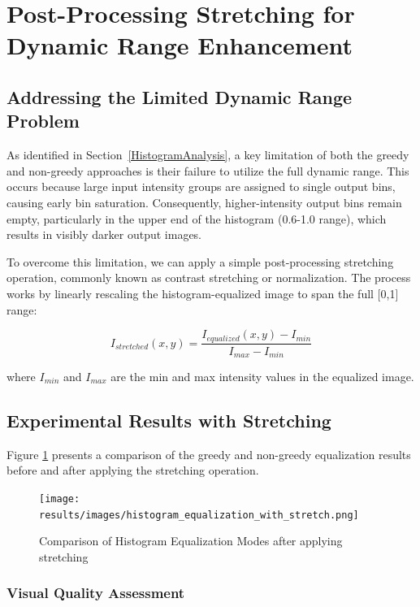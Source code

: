 \documentclass[12pt,a4paper]{article}
\begin{document}
\appendix

\section{Post-Processing Stretching for Dynamic Range Enhancement}\label{appendix:stretching}

\subsection{Addressing the Limited Dynamic Range Problem}

As identified in Section~\ref{HistogramAnalysis}, a key limitation of both the greedy and non-greedy approaches is their failure to utilize the full dynamic range. This occurs because large input intensity groups are assigned to single output bins, causing early bin saturation. Consequently, higher-intensity output bins remain empty, particularly in the upper end of the histogram (0.6-1.0 range), which results in visibly darker output images.

To overcome this limitation, we can apply a simple post-processing stretching operation, commonly known as contrast stretching or normalization. The process works by linearly rescaling the histogram-equalized image to span the full [0,1] range:

\begin{equation}
I_{stretched}(x,y) = \frac{I_{equalized}(x,y) - I_{min}}{I_{max} - I_{min}}
\end{equation}

where $I_{min}$ and $I_{max}$ are the min and max intensity values in the equalized image.

\subsection{Experimental Results with Stretching}

Figure \ref{fig:stretch_comp} presents a comparison of the greedy and non-greedy equalization results before and after applying the stretching operation.

\begin{figure}[H]
    \centering
    \texttt{[image: results/images/histogram\_equalization\_with\_stretch.png]}
    \caption{Comparison of Histogram Equalization Modes after applying stretching}
    \label{fig:stretch_comp}
\end{figure}

\subsubsection{Visual Quality Assessment}
\end{document}
